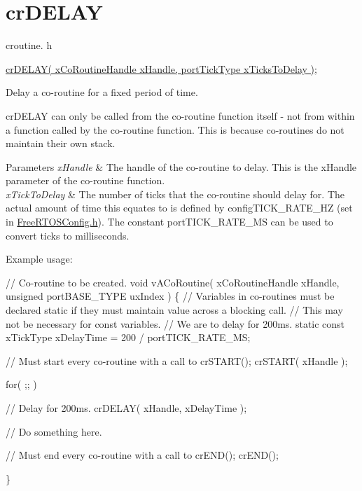 \hypertarget{group__crDELAY}{}\section{cr\+D\+E\+L\+AY}
\label{group__crDELAY}
croutine. h 
\begin{DoxyPre}
\hyperlink{croutine_8h_a05a06feb11028f2d1d440ea335f562ba}{crDELAY( xCoRoutineHandle xHandle, portTickType xTicksToDelay )};\end{DoxyPre}


Delay a co-\/routine for a fixed period of time.

cr\+D\+E\+L\+AY can only be called from the co-\/routine function itself -\/ not from within a function called by the co-\/routine function. This is because co-\/routines do not maintain their own stack.


\begin{DoxyParams}{Parameters}
{\em x\+Handle} & The handle of the co-\/routine to delay. This is the x\+Handle parameter of the co-\/routine function.\\
\hline
{\em x\+Tick\+To\+Delay} & The number of ticks that the co-\/routine should delay for. The actual amount of time this equates to is defined by config\+T\+I\+C\+K\+\_\+\+R\+A\+T\+E\+\_\+\+HZ (set in \hyperlink{FreeRTOSConfig_8h}{Free\+R\+T\+O\+S\+Config.\+h}). The constant port\+T\+I\+C\+K\+\_\+\+R\+A\+T\+E\+\_\+\+MS can be used to convert ticks to milliseconds.\\
\hline
\end{DoxyParams}
Example usage\+: 
\begin{DoxyPre}
// Co-routine to be created.
void vACoRoutine( xCoRoutineHandle xHandle, unsigned portBASE\_TYPE uxIndex )
\{
// Variables in co-routines must be declared static if they must maintain value across a blocking call.
// This may not be necessary for const variables.
// We are to delay for 200ms.
static const xTickType xDelayTime = 200 / portTICK\_RATE\_MS;
\begin{DoxyVerb}// Must start every co-routine with a call to crSTART();
crSTART( xHandle );

for( ;; )
{
   // Delay for 200ms.
   crDELAY( xHandle, xDelayTime );

   // Do something here.
}

// Must end every co-routine with a call to crEND();
crEND();
\end{DoxyVerb}

\}\end{DoxyPre}
 